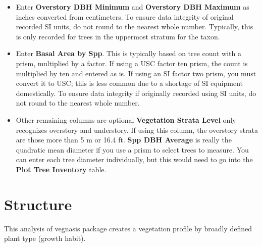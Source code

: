 \documentclass[
]{book}
\begin{document}
\begin{itemize}
\item
  Enter \textbf{Overstory DBH Minimum} and \textbf{Overstory DBH Maximum} as inches converted from centimeters. To ensure data integrity of original recorded SI units, do not round to the nearest whole number. Typically, this is only recorded for trees in the uppermost stratum for the taxon.
\item
  Enter \textbf{Basal Area by Spp}. This is typically based on tree count with a prism, multiplied by a factor. If using a USC factor ten prism, the count is multiplied by ten and entered as is. If using an SI factor two prism, you must convert it to USC; this is less common due to a shortage of SI equipment domestically. To ensure data integrity if originally recorded using SI units, do not round to the nearest whole number.
\item
  Other remaining columns are optional \textbf{Vegetation Strata Level} only recognizes overstory and understory. If using this column, the overstory strata are those more than 5 m or 16.4 ft. \textbf{Spp DBH Average} is really the quadratic mean diameter if you use a prism to select trees to measure. You can enter each tree diameter individually, but this would need to go into the \textbf{Plot Tree Inventory} table.
\end{itemize}

\hypertarget{structure}{%
\chapter{Structure}\label{structure}}

This analysis of vegnasis package creates a vegetation profile by broadly defined plant type (growth habit).
\end{document}
